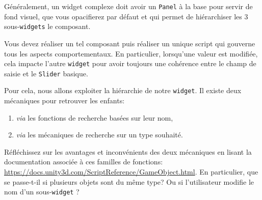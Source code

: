 \documentclass[a4paper,10pt]{article}
\newenvironment{info}%
{\begin{tcolorbox}[breakable,colback=green!5!white,colframe=green!75!black,title=Information]}%
{\end{tcolorbox}}
\begin{document}
\begin{info}
Généralement, un widget complexe doit avoir un \texttt{Panel} à la base pour servir de fond visuel, que vous opacifierez par défaut et qui permet de hiérarchiser les 3 sous-\texttt{widgets} le composant.
\end{info}

Vous devez réaliser un tel composant puis réaliser un unique script qui gouverne tous les aspects comportementaux. En particulier, lorsqu'une valeur est modifiée, cela impacte l'autre \texttt{widget} pour avoir toujours une cohérence entre le champ de saisie et le \texttt{Slider} basique.

Pour cela, nous allons exploiter la hiérarchie de notre \texttt{widget}. Il existe deux mécaniques pour retrouver les enfants:
\begin{enumerate}
	\item \textit{via} les fonctions de recherche basées sur leur nom,
	\item \textit{via} les mécaniques de recherche sur un type souhaité.
\end{enumerate}
Réfléchissez sur les avantages et inconvénients des deux mécaniques en lisant la documentation associée à ces familles de fonctions: \url{https://docs.unity3d.com/ScriptReference/GameObject.html}.
En particulier, que se passe-t-il si plusieurs objets sont du même type? Ou si l'utilisateur modifie le nom d'un sous-\texttt{widget} ?
\end{document}
